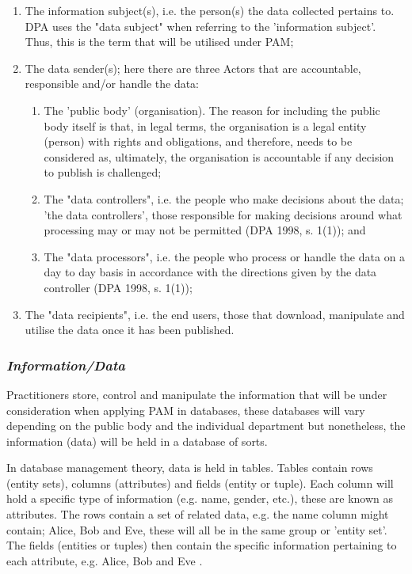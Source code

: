 \begin{enumerate}

\item The information subject(s), i.e. the person(s) the data collected pertains to.  DPA uses the "data subject" when referring to the 'information subject'. Thus, this is the term that will be utilised under PAM; 

\item	The data sender(s); here there are three Actors that are accountable, responsible and/or handle the data:

\begin {enumerate}

\item The 'public body' (organisation). The reason for including the public body itself is that, in legal terms, the organisation is a legal entity (person) with rights and obligations\citep{LegalStatusofPC}, and therefore, needs to be considered as, ultimately, the organisation is accountable if any decision to publish is challenged;

\item The "data controllers", i.e. the people who make decisions about the data; 'the data controllers', those responsible for making decisions around what processing may or may not be permitted (DPA 1998, s. 1(1)); and

\item The "data processors", i.e. the people who process or handle the data on a day to day basis in accordance with the directions given by the data controller (DPA 1998, s. 1(1)); 
\end {enumerate}

\item	The "data recipients", i.e. the end users, those that download, manipulate and utilise the data once it has been published.
\end{enumerate}

\subsubsection {{\it Information/Data}}
Practitioners store, control and manipulate the information that will be under consideration when applying PAM in databases, these databases will vary depending on the public body and the individual department but nonetheless, the information (data) will be held in a database of sorts.  

In database management theory, data is held in tables. Tables contain rows (entity sets), columns (attributes) and fields (entity or tuple). Each column will hold a specific type of information (e.g. name, gender, etc.), these are known as attributes. The rows contain a set of related data, e.g. the name column might contain; Alice, Bob and Eve, these will all be in the same group or 'entity set'. The fields (entities or tuples) then contain the specific information pertaining to each attribute, e.g. Alice, Bob and Eve \citep{Chen:1976:EMU:320434.320440}.

